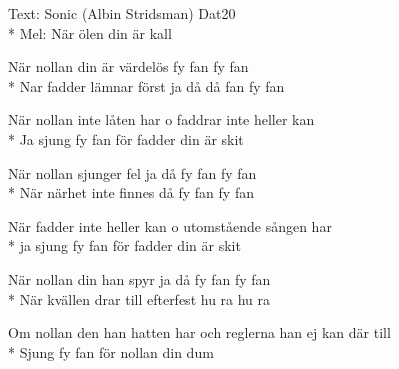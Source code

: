 \begin{SongText}
    \begin{SongInfo}
        Text: Sonic (Albin Stridsman) Dat20\\*%
        Mel: När ölen din är kall
    \end{SongInfo}
    \begin{SongVerse}
        När nollan din är värdelös fy fan fy fan \\*%
        Nar fadder lämnar först ja då då fan fy fan
    \end{SongVerse}
    \begin{SongVerse}
        När nollan inte låten har o faddrar inte heller kan\\*%
        Ja sjung fy fan för fadder din är skit
    \end{SongVerse}
    \begin{SongVerse}
        När nollan sjunger fel ja då fy fan fy fan \\*%
        När närhet inte finnes då fy fan fy fan
    \end{SongVerse}
    \begin{SongVerse}
        När fadder inte heller kan o utomstående sången har \\*%
        ja sjung fy fan för fadder din är skit
    \end{SongVerse}
    \begin{SongVerse}
        När nollan din han spyr ja då fy fan fy fan\\*%
        När kvällen drar till efterfest hu ra hu ra
    \end{SongVerse}
    \begin{SongVerse}
        Om nollan den han hatten har och reglerna han ej kan där till \\*%
        Sjung fy fan för nollan din dum
    \end{SongVerse}
\end{SongText}
